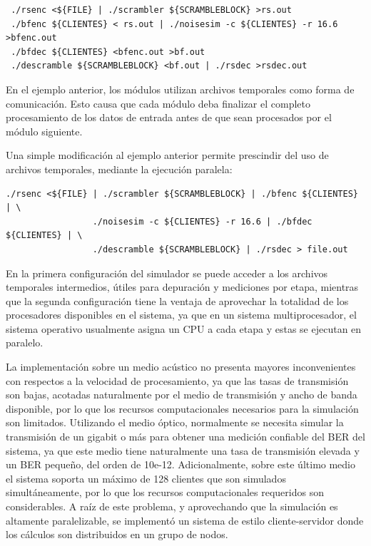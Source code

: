 \small
\begin{verbatim}
 ./rsenc <${FILE} | ./scrambler ${SCRAMBLEBLOCK} >rs.out
 ./bfenc ${CLIENTES} < rs.out | ./noisesim -c ${CLIENTES} -r 16.6 >bfenc.out
 ./bfdec ${CLIENTES} <bfenc.out >bf.out
 ./descramble ${SCRAMBLEBLOCK} <bf.out | ./rsdec >rsdec.out
\end{verbatim}
\normalsize

En el ejemplo anterior, los módulos utilizan archivos temporales como forma de comunicación. Esto causa que cada módulo deba finalizar el completo procesamiento de los datos de entrada antes de que sean procesados por el módulo siguiente.

Una simple modificación al ejemplo anterior permite prescindir del uso de archivos temporales, mediante la ejecución paralela:
\small
\begin{verbatim}
./rsenc <${FILE} | ./scrambler ${SCRAMBLEBLOCK} | ./bfenc ${CLIENTES} | \
                 ./noisesim -c ${CLIENTES} -r 16.6 | ./bfdec ${CLIENTES} | \ 
                 ./descramble ${SCRAMBLEBLOCK} | ./rsdec > file.out
\end{verbatim}
\normalsize

En la primera configuración del simulador se puede acceder a los archivos temporales intermedios, útiles para depuración y mediciones por etapa, mientras que la segunda configuración tiene la ventaja de aprovechar la totalidad de los procesadores disponibles en el sistema, ya que en un sistema multiprocesador, el sistema operativo usualmente asigna un CPU a cada etapa y estas se ejecutan en paralelo.

La implementación sobre un medio acústico no presenta mayores inconvenientes con respectos a la velocidad de procesamiento, ya que las tasas de transmisión son bajas, acotadas naturalmente por el medio de transmisión y ancho de banda disponible, por lo que los recursos computacionales necesarios para la simulación son limitados. 
Utilizando el medio óptico, normalmente se necesita simular la transmisión de un gigabit o más para obtener una medición confiable del BER del sistema, ya que este medio tiene naturalmente una tasa de transmisión elevada y un BER pequeño, del orden de 10e-12. Adicionalmente, sobre este último medio el sistema soporta un máximo de 128 clientes que son simulados simultáneamente, por lo que los recursos computacionales requeridos son considerables. A raíz de este problema, y aprovechando que la simulación es altamente paralelizable, se implementó un sistema de estilo cliente-servidor donde los cálculos son distribuidos en un grupo de nodos.


